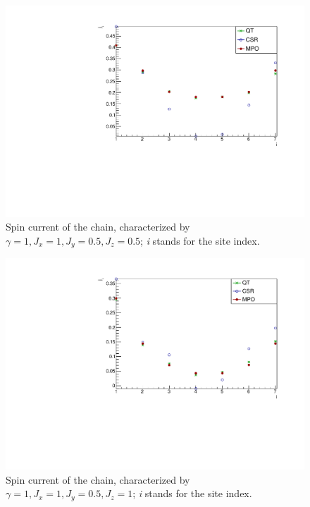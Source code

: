 \begin{figure}[H]
    \centering
    \includegraphics[scale=0.7]{Figures/8sites_comparison/SpinCurr_8s_J10505.pdf}
    \caption{Spin current of the chain, characterized by $\gamma=1, J_x=1, J_y=0.5, J_z=0.5$; \emph{i} stands for the site index.}
    \label{fig:my_label}
\end{figure}

\begin{figure}[H]
    \centering
    \includegraphics[scale=0.7]{Figures/8sites_comparison/SpinCurr_8s_J1051.pdf}
    \caption{Spin current of the chain, characterized by $\gamma=1, J_x=1, J_y=0.5, J_z=1$; \emph{i} stands for the site index.}
    \label{fig:my_label}
\end{figure}

